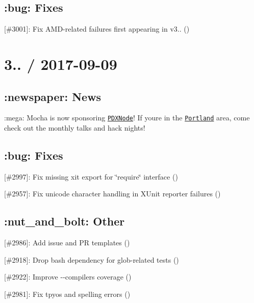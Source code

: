 \subsection*{\+:bug\+: Fixes}


\begin{DoxyItemize}
\item \mbox{[}\#3001\mbox{]}\+: Fix A\+M\+D-\/related failures first appearing in v3.. (\href{https://github.com/boneskull}{\tt })
\end{DoxyItemize}

\section*{3.. / 2017-\/09-\/09}

\subsection*{\+:newspaper\+: News}


\begin{DoxyItemize}
\item \+:mega\+: Mocha is now sponsoring \href{http://pdxnode.org}{\tt P\+D\+X\+Node}! If you\textquotesingle{}re in the \href{https://wikipedia.org/wiki/Portland,_Oregon}{\tt Portland} area, come check out the monthly talks and hack nights!
\end{DoxyItemize}

\subsection*{\+:bug\+: Fixes}


\begin{DoxyItemize}
\item \mbox{[}\#2997\mbox{]}\+: Fix missing {\ttfamily xit} export for \char`\"{}require\char`\"{} interface (\href{https://github.com/solodynamo}{\tt })
\item \mbox{[}\#2957\mbox{]}\+: Fix unicode character handling in X\+Unit reporter failures (\href{https://github.com/jkrems}{\tt })
\end{DoxyItemize}

\subsection*{\+:nut\+\_\+and\+\_\+bolt\+: Other}


\begin{DoxyItemize}
\item \mbox{[}\#2986\mbox{]}\+: Add issue and PR templates (\href{https://github.com/kungapal}{\tt })
\item \mbox{[}\#2918\mbox{]}\+: Drop bash dependency for glob-\/related tests (\href{https://github.com/ScottFreeCode}{\tt })
\item \mbox{[}\#2922\mbox{]}\+: Improve {\ttfamily -\/-\/compilers} coverage (\href{https://github.com/ScottFreeCode}{\tt })
\item \mbox{[}\#2981\mbox{]}\+: Fix tpyos and spelling errors (\href{https://github.com/jsoref}{\tt })
\end{DoxyItemize}

